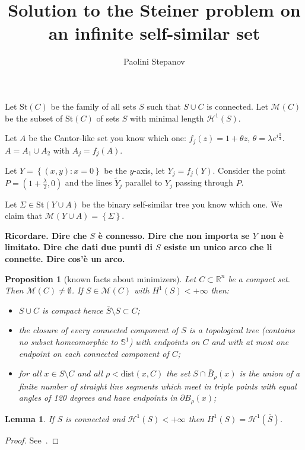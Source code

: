 \documentclass{article}
\title{Solution to the Steiner problem on an infinite self-similar set}
\author{Paolini Stepanov}
\newcommand{\RR}{\mathbb R}
\renewcommand{\H}{\mathcal H}
\newcommand{\ENCLOSE}[1]{\left\{#1\right\}}
\newcommand{\St}{\mathrm{St}}
\newcommand{\M}{\mathcal{M}}
\renewcommand{\H}{\mathcal{H}}
\newcommand{\dist}{\mathrm{dist}}
\newtheorem{proposition}[theorem]{Proposition}
\newtheorem{lemma}[theorem]{Lemma}
\theoremstyle{definition}
\theoremstyle{remark}
\begin{document}
\maketitle
Let $\St(C)$ be the family of all sets $S$ such that 
$S\cup C$ is connected.
Let $\M(C)$ be the subset of $\St(C)$ of sets $S$ 
with minimal length $\H^1(S)$.

Let $A$ be the Cantor-like set you know which one: 
$f_j(z) = 1 + \theta z$,
$\theta = \lambda e^{i \frac \pi 3}$.
$A=A_1\cup A_2$ 
with $A_j = f_j(A)$.

Let $Y=\ENCLOSE{(x,y)\colon x=0}$ be the $y$-axis,
let $Y_j = f_j(Y)$.
Consider the point $P=(1+\frac\lambda 2,0)$ 
and the lines $\tilde Y_j$ parallel to $Y_j$ 
passing through $P$.

Let $\Sigma\in \St(Y\cup A)$ be the binary self-similar 
tree you know which one.
We claim that $\M(Y\cup A)=\ENCLOSE{\Sigma}$.

\textbf{Ricordare. Dire che $S$ è connesso. 
Dire che non importa se $Y$ non è limitato.
Dire che dati due punti di $S$ esiste un unico arco che li connette.
Dire cos'è un arco. }

\begin{proposition}[known facts about minimizers]\label{prop:PaoSte}
  Let $C\subset \RR^n$ be a compact set.
  Then $\M(C)\neq \emptyset$. If $S\in \M(C)$
  with $H^1(S)<+\infty$
  then:
  \begin{itemize}
    \item[(i)] $S\cup C$ is compact hence 
    $\bar S \setminus S \subset C$;
    \item[(ii)] the closure of every connected component of $S$     
    is a topological tree 
    (contains no subset homeomorphic to $\mathbb S^1$)
    with endpoints on $C$ and with at most one endpoint 
    on each connected component of $C$;
    \item[(iii)] for all $x\in S\setminus C$ and all 
    $\rho < \dist(x,C)$ the set $S\cap \bar B_\rho(x)$ 
    is the union of a finite number of straight line 
    segments which meet in triple points with equal 
    angles of 120 degrees and have endpoints in 
    $\partial B_\rho(x)$;
  \end{itemize}
\end{proposition}

\begin{lemma}\label{lm:connected}
If $S$ is connected and $\H^1(S)<+\infty$ then $H^1(S) = \H^1(\bar S)$.
\end{lemma}
\begin{proof}
  See~\cite[lemma~2.6]{PaoSte}.
\end{proof}
\end{document}
